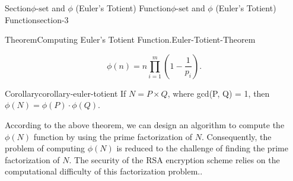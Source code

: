\documentclass[oneside,12pt,]{article}
\numberwithin{equation}{section}
\begin{document}
\begin{sectionptx}{Section}{\(\phi\text{-set}\) and \(\phi\) (Euler's Totient) Function}{}{\(\phi\text{-set}\) and \(\phi\) (Euler's Totient) Function}{}{}{section-3}
\begin{theorem}{Theorem}{Computing Euler's Totient Function.}{}{Euler-Totient-Theorem}
\begin{enumerate}
\begin{equation*}
\phi(n) = n \prod_{i=1}^{m} \left( 1 - \frac{1}{p_i} \right)\text{.}
\end{equation*}
%
\end{enumerate}
\end{theorem}
\begin{corollary}{Corollary}{}{}{corollary-euler-totient}%
If \(N = P \times Q\), where gcd(P, Q) = 1, then \(\phi(N) = \phi(P) \cdot \phi(Q)\).%
\end{corollary}
According to the above theorem, we can design an algorithm to compute the \(\phi(N)\) function by using the prime factorization of \(N\). Consequently, the problem of computing \(\phi(N)\) is reduced to the challenge of finding the prime factorization of \(N\). The security of the RSA encryption scheme relies on the computational difficulty of this factorization problem..%
\end{sectionptx}
%
%
\typeout{************************************************}
\typeout{************************************************}
%
\end{document}
